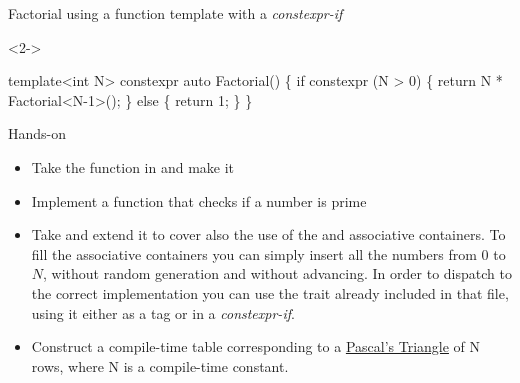 \begin{frame}[fragile]{}

  Factorial using a function template with a \textit{constexpr-if}

  \begin{codeblock}<2->{
template<int N>
\alert<2>{constexpr} auto Factorial()
\{
  if constexpr (N > 0) \{
    return N * Factorial<N-1>();
  \} else \{
    return 1;
  \}
\}

}\end{codeblock}
  
\end{frame}

\begin{frame}{Hands-on}
  \begin{itemize}
  \item Take the  function in  and make it 
  \item Implement a  function that checks if a number is prime
  \item Take  and extend it to cover also the use of
    the  and  associative containers.
    To fill the associative containers you can simply insert all the numbers
    from $0$ to $N$, without random generation and without advancing. In order
    to dispatch to the correct implementation you can use the
     trait already included in that file, using it either
    as a tag or in a \textit{constexpr-if}.
  \item Construct a compile-time table corresponding to a
    \href{https://en.wikipedia.org/wiki/Pascal\%27s_triangle}{Pascal's Triangle}
    of N rows, where N is a compile-time constant.
  \end{itemize}
\end{frame}
